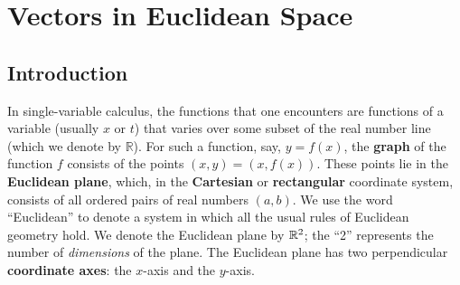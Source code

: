 \chapter{Vectors in Euclidean Space}
\section{Introduction}
In single-variable calculus, the functions that one encounters are functions of a variable (usually $x$ or $t$) 
that varies over some subset of the real number line (which we denote by $\mathbb{R}$).  For such a function, say,
$y = f(x)$, the \textbf{graph} of the function $f$ consists of the points $(x, y) = (x, f(x))$.  These points lie in
the \textbf{Euclidean plane}, which, in the \textbf{Cartesian} or
\textbf{rectangular} coordinate system, consists
of all ordered pairs of real numbers $(a, b)$.  We use the word ``Euclidean'' to denote a system in which all the
usual rules of Euclidean geometry hold.  We denote the Euclidean plane by $\mathbb{R}^{2}$;
the ``2'' represents
the number of \emph{dimensions} of the plane.  The Euclidean plane has two perpendicular
\textbf{coordinate axes}: the $x$-axis and the $y$-axis.

